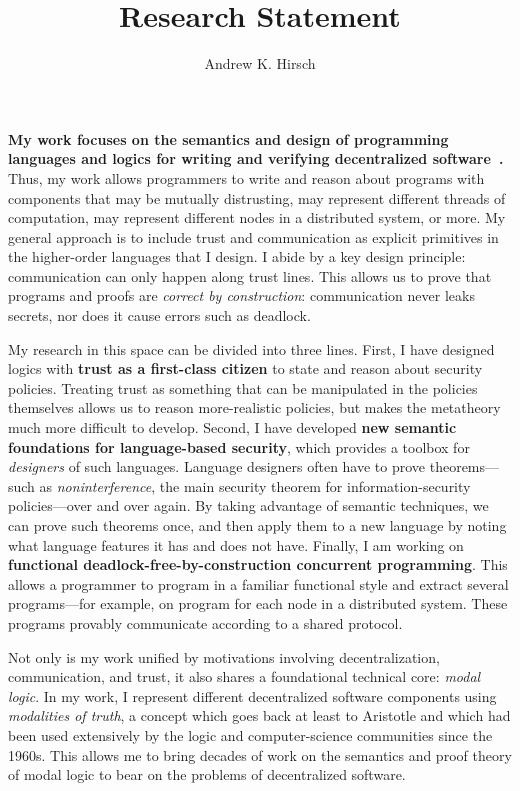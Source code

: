 \documentclass{article}
\author{Andrew K. Hirsch}
\title{Research Statement}
\date{}
\theoremstyle{definition}
\begin{document}
\maketitle

\textbf{My work focuses on the semantics and design of programming languages and logics for writing and verifying decentralized software~\citep{SilverHHCZ22,MenzHLG22,HirschG22,HirschC21,HirschACAT20,HirschT18,HirschC13}.}
Thus, my work allows programmers to write and reason about programs with components that may be mutually distrusting, may represent different threads of computation, may represent different nodes in a distributed system, or more.
My general approach is to include trust and communication as explicit primitives in the higher-order languages that I design.
I abide by a key design principle: communication can only happen along trust lines.
This allows us to prove that programs and proofs are \emph{correct by construction}: communication never leaks secrets, nor does it cause errors such as deadlock.

My research in this space can be divided into three lines.
First, I have designed logics with \textbf{trust as a first-class citizen} to state and reason about security policies.
Treating trust as something that can be manipulated in the policies themselves allows us to reason more-realistic policies, but makes the metatheory much more difficult to develop.
Second, I have developed \textbf{new semantic foundations for language-based security}, which provides a toolbox for \emph{designers} of such languages.
Language designers often have to prove theorems---such as \emph{noninterference}, the main security theorem for information-security policies---over and over again.
By taking advantage of semantic techniques, we can prove such theorems once, and then apply them to a new language by noting what language features it has and does not have.
Finally, I am working on \textbf{functional deadlock-free-by-construction concurrent programming}.
This allows a programmer to program in a familiar functional style and extract several programs---for example, on program for each node in a distributed system.
These programs provably communicate according to a shared protocol.

Not only is my work unified by motivations involving decentralization, communication, and trust, it also shares a foundational technical core: \emph{modal logic}.
In my work, I represent different decentralized software components using \emph{modalities of truth}, a concept which goes back at least to Aristotle and which had been used extensively by the logic and computer-science communities since the 1960s.
This allows me to bring decades of work on the semantics and proof theory of modal logic to bear on the problems of decentralized software.
\end{document}

